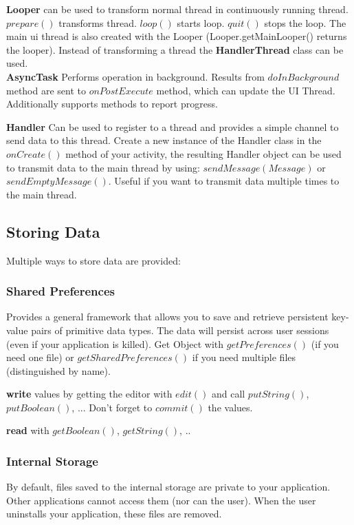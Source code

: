 \textbf{Looper} can be used to transform normal thread in continuously running
thread. $prepare()$ transforms thread. $loop()$ starts loop. $quit()$ stops the
loop. The main ui thread is also created with the Looper
(Looper.getMainLooper() returns the looper). Instead of transforming a thread
the \textbf{HandlerThread} class can be used.\\

\textbf{AsyncTask}
Performs operation in background. Results from $doInBackground$ method are sent
to $onPostExecute$ method, which can update the UI Thread. Additionally
supports methods to report progress.

\textbf{Handler}
Can be used to register to a thread and provides a simple channel to send data
to this thread. Create a new instance of the Handler class in the $onCreate()$
method of your activity, the resulting Handler object can be used to transmit
data to the main thread by using: $sendMessage(Message)$ or
$sendEmptyMessage()$. Useful if you want to transmit data multiple times to the
main thread.

\subsection{Storing Data}
Multiple ways to store data are provided:
\subsubsection{Shared Preferences}
Provides a general framework that allows you to save and retrieve persistent
key-value pairs of primitive data types. The data will persist across user
sessions (even if your application is killed). Get Object with
$getPreferences()$ (if you need one file) or $getSharedPreferences()$ if you
need multiple files (distinguished by name).

\textbf{write} values by getting the editor with $edit()$ and call
$putString()$, $putBoolean()$, ... Don't forget to $commit()$ the values.

\textbf{read} with $getBoolean()$, $getString()$, ..

\subsubsection{Internal Storage}
By default, files saved to the internal storage are private to your
application. Other applications cannot access them (nor can the user). When the
user uninstalls your application, these files are removed.

